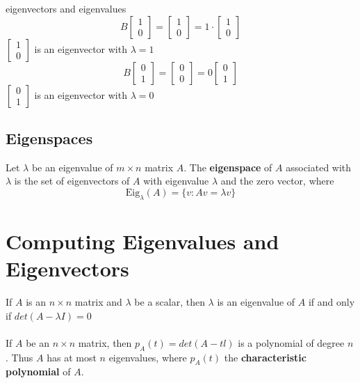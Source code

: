 \begin{enumerate}
eigenvectors and eigenvalues 
\[
  B\begin{bmatrix}1 \\ 0 \end{bmatrix} = \begin{bmatrix}1 \\ 0 
  \end{bmatrix} = 1 \cdot \begin{bmatrix} 1 \\ 0 \end{bmatrix}
\]
$\begin{bmatrix} 1 \\ 0 \end{bmatrix}$ is an eigenvector with 
$\lambda = 1$
\[
  B\begin{bmatrix}0 \\ 1\end{bmatrix} = \begin{bmatrix}0 \\ 0 
  \end{bmatrix} = 0 \begin{bmatrix} 0 \\ 1 \end{bmatrix}
\]
$\begin{bmatrix} 0 \\ 1 \end{bmatrix}$ is an eigenvector with 
$\lambda = 0$
\subsection{Eigenspaces}
Let $\lambda$ be an eigenvalue of $m \times n$ matrix $A$. The 
\textbf{eigenspace} of $A$ associated with $\lambda$ is the set of 
eigenvectors of $A$ with eigenvalue $\lambda$ and the zero vector, 
where
\[
  \text{Eig}_\lambda(A) = \{v : Av = \lambda v\}
\]
\section{Computing Eigenvalues and Eigenvectors}
If $A$ is an $n \times n$ matrix and $\lambda$ be a scalar, then 
$\lambda$ is an eigenvalue of $A$ if and only if 
$det(A - \lambda I) = 0$ \\\\
If $A$ be an $n \times n$ matrix, then $p_A(t) = det(A - tl)$ is a 
polynomial of degree $n$. Thus $A$ has at most $n$ eigenvalues, where 
$p_A(t)$ the \textbf{characteristic polynomial} of $A$.

\end{enumerate}
